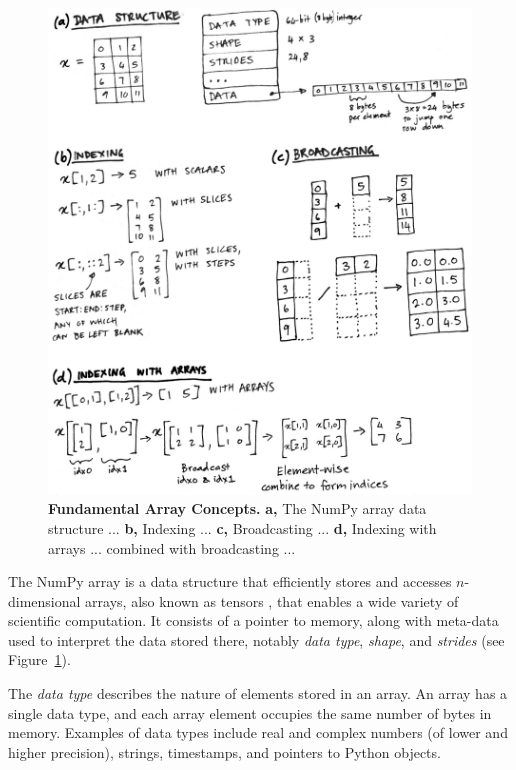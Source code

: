 \begin{figure}
  \centering
  \includegraphics[width=\textwidth]{static/sketches/array-concepts}
  \caption{\textbf{Fundamental Array Concepts.}
    \textbf{a,} The NumPy array data structure ...
    \textbf{b,} Indexing ...
    \textbf{c,} Broadcasting ...
    \textbf{d,} Indexing with arrays ... combined with broadcasting ...
   }
  \label{fig:array-concepts}
\end{figure}

The NumPy array is a data structure that efficiently stores and accesses $n$-dimensional arrays, also known as tensors \cite{vanderwalt2011numpy}, that enables a wide variety of scientific computation.  It consists of a pointer to memory, along with meta-data used to interpret the data stored there, notably {\em data type}, {\em shape}, and {\em strides} (see Figure~\ref{fig:array-concepts}).

The {\em data type} describes the nature of elements stored in an array.  An array has a single data type, and each array element occupies the same number of bytes in memory.  Examples of data types include real and complex numbers (of lower and higher precision), strings, timestamps, and pointers to Python objects.

